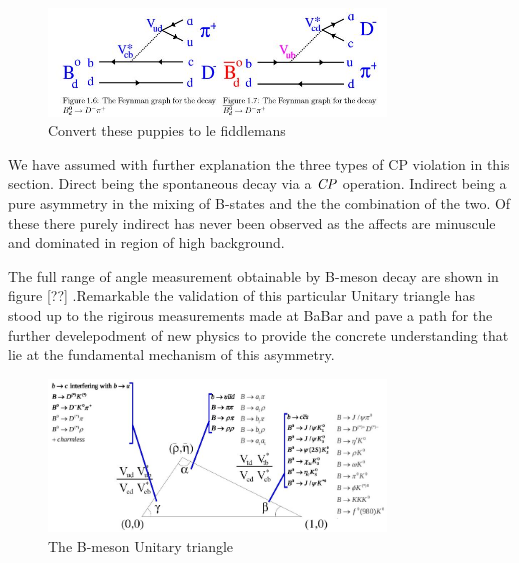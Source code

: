\documentclass[floatfix,aps,prd,amsmath,amssymb]{revtex4}
\begin{document}
 \begin{figure}[h]
\centering
\includegraphics[width=0.8\textwidth]{figs/gam.jpg}
\caption{Convert these puppies to le fiddlemans}
\label{pBGD}
\end{figure}


We have assumed with further explanation the three types of CP violation in this section. Direct being the spontaneous decay via a $\it{CP}$ operation. Indirect being a pure asymmetry in the mixing of B-states and the the combination of the two. Of these there purely indirect has never been observed as the affects are minuscule and dominated in region of high background.


The full range of angle measurement obtainable by B-meson decay are shown in figure [??] .Remarkable the validation of this particular Unitary triangle has stood up to the rigirous measurements made at BaBar and pave a path for the further develepodment of new physics to provide the concrete understanding that lie at the fundamental mechanism of this asymmetry.
 \begin{figure}[h]
\centering
\includegraphics[width=0.8\textwidth]{figs/trig.jpg}
\caption{The B-meson Unitary triangle}
\label{BBD}
\end{figure}

\end{document}
